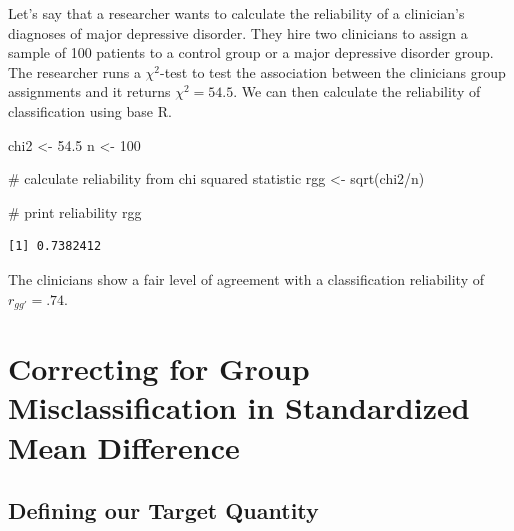 \documentclass[
  letterpaper,
  DIV=11,
  numbers=noendperiod]{scrreprt}
\newenvironment{Shaded}{}{}
\newcommand{\CommentTok}[1]{\textcolor[rgb]{0.54,0.53,0.53}{#1}}
\newcommand{\DecValTok}[1]{\textcolor[rgb]{0.69,0.50,0.00}{#1}}
\newcommand{\FloatTok}[1]{\textcolor[rgb]{0.69,0.50,0.00}{#1}}
\newcommand{\FunctionTok}[1]{\textcolor[rgb]{0.39,0.29,0.61}{#1}}
\newcommand{\NormalTok}[1]{\textcolor[rgb]{0.12,0.11,0.11}{#1}}
\newcommand{\OtherTok}[1]{\textcolor[rgb]{0.00,0.43,0.16}{#1}}
\newcommand{\SpecialCharTok}[1]{\textcolor[rgb]{0.24,0.68,0.91}{#1}}
\begin{document}
\begin{tcolorbox}[enhanced jigsaw, opacityback=0, coltitle=black, toprule=.15mm, colframe=quarto-callout-note-color-frame, bottomtitle=1mm, rightrule=.15mm, colbacktitle=quarto-callout-note-color!10!white, left=2mm, bottomrule=.15mm, breakable, title={Applied Example in R}, colback=white, opacitybacktitle=0.6, titlerule=0mm, arc=.35mm, leftrule=.75mm, toptitle=1mm]

Let's say that a researcher wants to calculate the reliability of a
clinician's diagnoses of major depressive disorder. They hire two
clinicians to assign a sample of 100 patients to a control group or a
major depressive disorder group. The researcher runs a \(\chi^2\)-test
to test the association between the clinicians group assignments and it
returns \(\chi^2=54.5\). We can then calculate the reliability of
classification using base R.

\begin{Shaded}
\begin{Highlighting}[]
\NormalTok{chi2 }\OtherTok{\textless{}{-}} \FloatTok{54.5}
\NormalTok{n }\OtherTok{\textless{}{-}} \DecValTok{100}

\CommentTok{\# calculate reliability from chi squared statistic}
\NormalTok{rgg }\OtherTok{\textless{}{-}} \FunctionTok{sqrt}\NormalTok{(chi2}\SpecialCharTok{/}\NormalTok{n)}

\CommentTok{\# print reliability}
\NormalTok{rgg}
\end{Highlighting}
\end{Shaded}

\begin{verbatim}
[1] 0.7382412
\end{verbatim}

The clinicians show a fair level of agreement with a classification
reliability of \(r_{gg'}=.74\).

\end{tcolorbox}

\section{Correcting for Group Misclassification in Standardized Mean
Difference}\label{correcting-for-group-misclassification-in-standardized-mean-difference}

\subsection{Defining our Target
Quantity}\label{defining-our-target-quantity}
\end{document}
